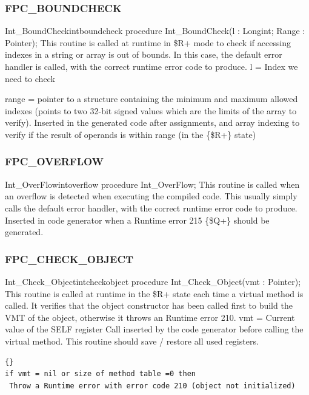 \documentclass [a4paper,12pt]{article}
\begin{document}
\subsubsection{FPC{\_}BOUNDCHECK}
\label{subsubsec:mylabel53}

\begin{procedurel}{Int{\_}BoundCheck}{intboundcheck}
\Declaration
procedure Int{\_}BoundCheck(l : Longint; Range : Pointer);
\Description
This routine is called at runtime in {\$}R+ mode to check if accessing
indexes in a string or array is out of bounds. In this case, the default
error handler is called, with the correct runtime error code to produce.
\Parameters
l = Index we need to check  \par
range = pointer to a structure containing the minimum and maximum allowed
indexes (points to two 32-bit signed values which are the limits of the
array to verify).
\Notes
Inserted in the generated code after assignments, and array indexing to
verify if the result of operands is within range (in the {\{}{\$}R+{\}}
state)
\end{procedurel}

\subsubsection{FPC{\_}OVERFLOW}
\label{subsubsec:mylabel54}

\begin{procedurel}{Int{\_}OverFlow}{intoverflow}
\Declaration
procedure Int{\_}OverFlow;
\Description
This routine is called when an overflow is detected when executing the
compiled code. This usually simply calls the default error handler, with the
correct runtime error code to produce.
\Parameters
Inserted in code generator when a Runtime error 215 {\{}{\$}Q+{\}} should be
generated.
\end{procedurel}

\subsubsection{FPC{\_}CHECK{\_}OBJECT}
\label{subsubsec:mylabel55}

\begin{procedurel}{Int{\_}Check{\_}Object}{intcheckobject}
\Declaration
procedure Int{\_}Check{\_}Object(vmt : Pointer);
\Description
This routine is called at runtime in the {\$}R+ state each time a virtual
method is called. It verifies that the object constructor has been called
first to build the VMT of the object, otherwise it throws an Runtime error 210.
\Parameters
vmt = Current value of the SELF register
\Notes
Call inserted by the code generator before calling the virtual method. This
routine should save / restore all used registers.
\Algorithm
\begin{lstlisting}{}
if vmt = nil or size of method table =0 then
 Throw a Runtime error with error code 210 (object not initialized)
\end{lstlisting}
\end{procedurel}
\end{document}
